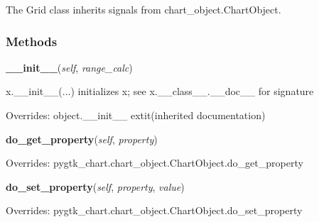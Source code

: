   The Grid class inherits signals from chart\_object.ChartObject.



  \subsubsection{Methods}

    \vspace{0.5ex}

\hspace{.8\funcindent}\begin{boxedminipage}{\funcwidth}

    \raggedright \textbf{\_\_init\_\_}(\textit{self}, \textit{range\_calc})

\setlength{\parskip}{2ex}
    x.\_\_init\_\_(...) initializes x; see x.\_\_class\_\_.\_\_doc\_\_ for 
    signature

\setlength{\parskip}{1ex}
      Overrides: object.\_\_init\_\_ 	extit{(inherited documentation)}

    \end{boxedminipage}

    \vspace{0.5ex}

\hspace{.8\funcindent}\begin{boxedminipage}{\funcwidth}

    \raggedright \textbf{do\_get\_property}(\textit{self}, \textit{property})

\setlength{\parskip}{2ex}
\setlength{\parskip}{1ex}
      Overrides: pygtk\_chart.chart\_object.ChartObject.do\_get\_property

    \end{boxedminipage}

    \vspace{0.5ex}

\hspace{.8\funcindent}\begin{boxedminipage}{\funcwidth}

    \raggedright \textbf{do\_set\_property}(\textit{self}, \textit{property}, \textit{value})

\setlength{\parskip}{2ex}
\setlength{\parskip}{1ex}
      Overrides: pygtk\_chart.chart\_object.ChartObject.do\_set\_property

    \end{boxedminipage}

